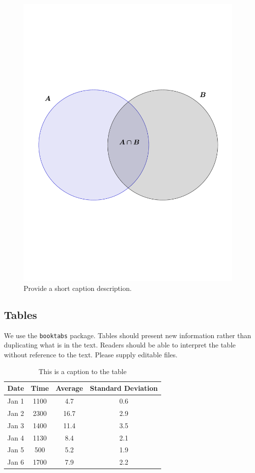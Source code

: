  \begin{figure}[h!] %
    \centering
    \includegraphics[scale=0.5]{figs/venn.pdf} 
    \caption{Provide a short caption description.}
    \label{fig:number}
 \end{figure}
 
 
\subsection*{Tables}
We use the \texttt{booktabs} package.  Tables should present new information rather than duplicating what is in the text. Readers should be able to interpret the table without reference to the text. Please supply editable files.


\begin{table}[ht!]
\begin{center}
\begin{tabular}{lccc} 
	\toprule
	Date & Time  &  Average   & Standard Deviation \\ 
	\midrule
	Jan 1  & 1100	& 4.7		& 0.6		\\
	Jan 2  & 2300	& 16.7	& 2.9		\\
	Jan 3  & 1400	& 11.4	& 3.5		\\
	Jan 4  & 1130	& 8.4		& 2.1		\\
	Jan 5  & 500	& 5.2		& 1.9		\\
	Jan 6  & 1700	& 7.9		& 2.2		\\
	\bottomrule 
\end{tabular} 
\caption{This is a caption to the table}
\label{tab:1} 
\end{center}
\end{table} %